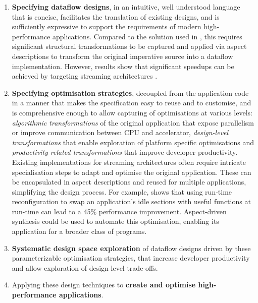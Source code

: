 \begin{enumerate}

\item \textbf{Specifying dataflow designs}, in an intuitive, well
  understood language that is concise, facilitates the translation of
  existing designs, and is sufficiently expressive to support the
  requirements of modern high-performance applications. Compared to
  the solution used in
  \cite{Cardoso:Teixeira:Alves:Nobre:Diniz:Cutinho:Luk:2012}, this
  requires significant structural transformations to be captured and
  applied via aspect descriptions to transform the original imperative
  source into a dataflow implementation. However, results show that
  significant speedups can be achieved by targeting streaming
  architectures \cite{Pell:Mencer:2011}.

\item \textbf{Specifying optimisation strategies}, decoupled from the
  application code in a manner that makes the specification easy to
  reuse and to customise, and is comprehensive enough to allow
  capturing of optimisations at various levels: \emph{algorithmic
    transformations} of the original application that expose
  parallelism or improve communication between CPU and accelerator,
  \emph{design-level transformations} that enable exploration of
  platform specific optimisations and \emph{productivity related
    transformations} that improve developer productivity. Existing
  implementations for streaming architectures often require intricate
  specialisation steps to adapt and optimise the original
  application. These can be encapsulated in aspect descriptions and
  reused for multiple applications, simplifying the design process.
  For example, \cite{Xinyu:Qiwei:Luk:Qiang:Pell:2012} shows that using
  run-time reconfiguration to swap an application's idle sections with
  useful functions at run-time can lead to a 45\% performance
  improvement. Aspect-driven synthesis could be used to automate this
  optimisation, enabling its application for a broader class of
  programs.

\item \textbf{Systematic design space exploration} of dataflow designs driven
  by these parameterizable optimisation strategies, that increase
  developer productivity and allow exploration of design level
  trade-offs.

\item Applying these design techniques to \textbf{create and optimise
  high-performance applications}.

\end{enumerate}

